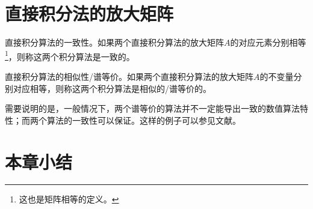 \section{直接积分法的放大矩阵}

\begin{definition}
直接积分算法的一致性\cite{Hoff1988c}。如果两个直接积分算法的放大矩阵$A$的对应元素分别相等\footnote{这也是矩阵相等的定义。}，则称这两个积分算法是一致的。
\end{definition}

\begin{definition}
直接积分算法的相似性/谱等价\cite{Hoff1988c}。如果两个直接积分算法的放大矩阵$A$的不变量分别对应相等，则称这两个积分算法是相似的/谱等价的。
\end{definition}

需要说明的是，一般情况下，两个谱等价的算法并不一定能导出一致的数值算法特性；而两个算法的一致性可以保证。这样的例子可以参见文献。

\section{本章小结}


